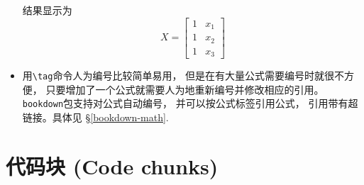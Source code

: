 \documentclass[]{ctexbook}
\begin{document}
\begin{itemize}
  结果显示为
  \[
  X = \begin{bmatrix}1 & x_{1}\\
  1 & x_{2}\\
  1 & x_{3}  \tag{4}
  \end{bmatrix}
  \]
\item
  用\texttt{\textbackslash{}tag}命令人为编号比较简单易用， 但是在有大量公式需要编号时就很不方便， 只要增加了一个公式就需要人为地重新编号并修改相应的引用。\texttt{bookdown}包支持对公式自动编号， 并可以按公式标签引用公式， 引用带有超链接。具体见 §\ref{bookdown-math}.
\end{itemize}

\hypertarget{ux4ee3ux7801ux5757-code-chunks}{%
\section{代码块 (Code chunks)}\label{ux4ee3ux7801ux5757-code-chunks}}
\end{document}

